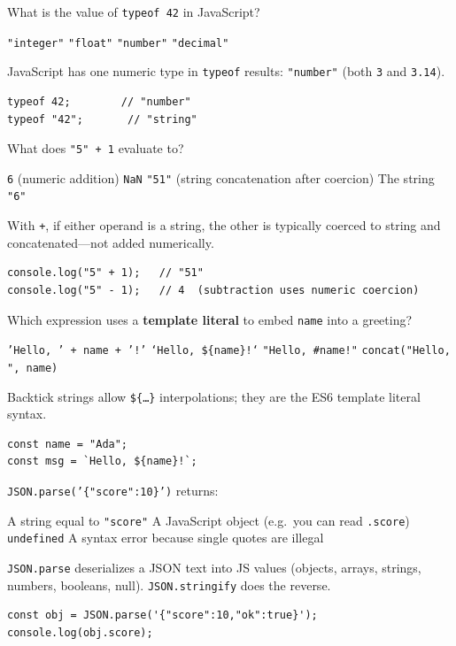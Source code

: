 \question[4]
What is the value of \texttt{typeof 42} in JavaScript?
\begin{choices}
  \choice \texttt{"integer"}
  \choice \texttt{"float"}
  \CorrectChoice \texttt{"number"}
  \choice \texttt{"decimal"}
\end{choices}
\begin{solution}
  JavaScript has one numeric type in \texttt{typeof} results: \texttt{"number"} (both \texttt{3} and \texttt{3.14}).
\begin{lstlisting}[style=js]
typeof 42;        // "number"
typeof "42";       // "string"
\end{lstlisting}
\end{solution}

\question[4]
What does \texttt{"5" + 1} evaluate to?
\begin{choices}
  \choice \texttt{6} (numeric addition)
  \choice \texttt{NaN}
  \CorrectChoice \texttt{"51"} (string concatenation after coercion)
  \choice The string \texttt{"6"}
\end{choices}
\begin{solution}
  With \texttt{+}, if either operand is a string, the other is typically coerced to string and concatenated---not added numerically.
\begin{lstlisting}[style=js]
console.log("5" + 1);   // "51"
console.log("5" - 1);   // 4  (subtraction uses numeric coercion)
\end{lstlisting}
\end{solution}

\question[4]
Which expression uses a \textbf{template literal} to embed \texttt{name} into a greeting?
\begin{choices}
  \choice \texttt{'Hello, ' + name + '!'}
  \CorrectChoice \texttt{`Hello, \$\{name\}!`}
  \choice \texttt{"Hello, \#name!"}
  \choice \texttt{concat("Hello, ", name)}
\end{choices}
\begin{solution}
  Backtick strings allow \texttt{\$\{\ldots\}} interpolations; they are the ES6 template literal syntax.
\begin{lstlisting}[style=js]
const name = "Ada";
const msg = `Hello, ${name}!`;
\end{lstlisting}
\end{solution}

\question[4]
\texttt{JSON.parse('\{"score":10\}')} returns:
\begin{choices}
  \choice A string equal to \texttt{"score"}
  \CorrectChoice A JavaScript object (e.g.\ you can read \texttt{.score})
  \choice \texttt{undefined}
  \choice A syntax error because single quotes are illegal
\end{choices}
\begin{solution}
  \texttt{JSON.parse} deserializes a JSON text into JS values (objects, arrays, strings, numbers, booleans, null). \texttt{JSON.stringify} does the reverse.
\begin{lstlisting}[style=js]
const obj = JSON.parse('{"score":10,"ok":true}');
console.log(obj.score);
\end{lstlisting}
\end{solution}

